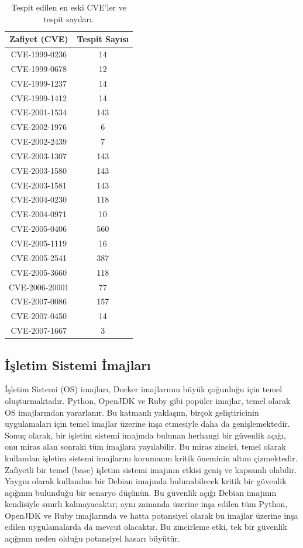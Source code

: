 \begin{table}
    \caption{Tespit edilen en eski CVE'ler ve tespit sayıları.}\label{tab:oldest-cves-count}
    \centering
    \begin{tabular}{ |c|c| }
        \hline
        Zafiyet (CVE) & Tespit Sayısı \\
        \hline
        CVE-1999{-}0236  & 14 \\
        CVE-1999{-}0678  & 12 \\
        CVE-1999{-}1237  & 14 \\
        CVE-1999{-}1412  & 14 \\
        CVE-2001{-}1534  & 143 \\
        CVE-2002{-}1976  & 6 \\
        CVE-2002{-}2439  & 7 \\
        CVE-2003{-}1307  & 143 \\
        CVE-2003{-}1580  & 143 \\
        CVE-2003{-}1581  & 143 \\
        CVE-2004{-}0230  & 118 \\
        CVE-2004{-}0971  & 10 \\
        CVE-2005{-}0406  & 560 \\
        CVE-2005{-}1119  & 16 \\
        CVE-2005{-}2541  & 387 \\
        CVE-2005{-}3660  & 118 \\
        CVE-2006{-}20001 & 77 \\
        CVE-2007{-}0086  & 157 \\
        CVE-2007{-}0450  & 14 \\
        CVE-2007{-}1667  & 3 \\
        \hline
    \end{tabular}
\end{table}

\subsection{İşletim Sistemi İmajları}\label{subsec:os-images}

İşletim Sistemi (OS) imajları, Docker imajlarının büyük çoğunluğu için temel oluşturmaktadır. Python, OpenJDK ve Ruby gibi popüler imajlar, temel olarak OS imajlarından yararlanır. Bu katmanlı yaklaşım, birçok geliştiricinin uygulamaları için temel imajlar üzerine inşa etmesiyle daha da genişlemektedir. Sonuç olarak, bir işletim sistemi imajında bulunan herhangi bir güvenlik açığı, onu miras alan sonraki tüm imajlara yayılabilir. Bu miras zinciri, temel olarak kullanılan işletim sistemi imajlarını korumanın kritik öneminin altını çizmektedir. Zafiyetli bir temel (base) işletim sistemi imajının etkisi geniş ve kapsamlı olabilir. Yaygın olarak kullanılan bir Debian imajında bulunabilecek kritik bir güvenlik açığının bulunduğu bir senaryo düşünün. Bu güvenlik açığı Debian imajının kendisiyle sınırlı kalmayacaktır; aynı zamanda üzerine inşa edilen tüm Python, OpenJDK ve Ruby imajlarında ve hatta potansiyel olarak bu imajlar üzerine inşa edilen uygulamalarda da mevcut olacaktır. Bu zincirleme etki, tek bir güvenlik açığının neden olduğu potansiyel hasarı büyütür.

